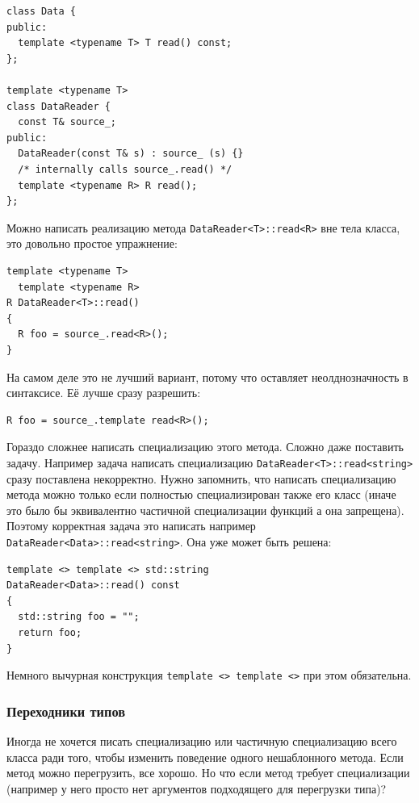 \documentclass[a4paper,12pt,oneside]{article}
\begin{document}
\begin{lstlisting}
class Data {
public:
  template <typename T> T read() const;
};

template <typename T>  
class DataReader {
  const T& source_;
public:
  DataReader(const T& s) : source_ (s) {}
  /* internally calls source_.read() */
  template <typename R> R read();
};
\end{lstlisting}

Можно написать реализацию метода \lstinline!DataReader<T>::read<R>! вне тела класса, это довольно простое упражнение:

\begin{lstlisting}
template <typename T>
  template <typename R> 
R DataReader<T>::read()
{
  R foo = source_.read<R>();
}
\end{lstlisting}

На самом деле это не лучший вариант, потому что оставляет неолднозначность в синтаксисе. Её лучше сразу разрешить:

\begin{lstlisting}
R foo = source_.template read<R>();
\end{lstlisting}

Гораздо сложнее написать специализацию этого метода. Сложно даже поставить задачу. Например задача написать специализацию \lstinline!DataReader<T>::read<string>! сразу поставлена некорректно. Нужно запомнить, что написать специализацию метода можно только если полностью специализирован также его класс (иначе это было бы эквивалентно частичной специализации функций а она запрещена). Поэтому корректная задача это написать например \lstinline!DataReader<Data>::read<string>!. Она уже может быть решена:

\begin{lstlisting}
template <> template <> std::string 
DataReader<Data>::read() const
{
  std::string foo = "";
  return foo;
}
\end{lstlisting}

Немного вычурная конструкция \lstinline!template <> template <>! при этом обязательна.

\subsubsection{Переходники типов}\label{TypeToTypes}

Иногда не хочется писать специализацию или частичную специализацию всего класса ради того, чтобы изменить поведение одного нешаблонного метода. Если метод можно перегрузить, все хорошо. Но что если метод требует специализации (например у него просто нет аргументов подходящего для перегрузки типа)? 
\end{document}
